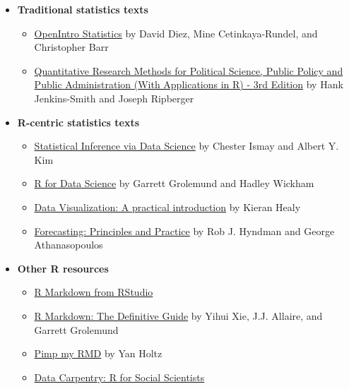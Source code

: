\documentclass[
]{book}
\providecommand{\tightlist}{%
  \setlength{\itemsep}{0pt}\setlength{\parskip}{0pt}}
\begin{document}
\begin{itemize}
\tightlist
\item
  \textbf{Traditional statistics texts}

  \begin{itemize}
  \tightlist
  \item
    \href{https://www.openintro.org/book/os/}{OpenIntro Statistics} by David Diez, Mine Cetinkaya-Rundel, and Christopher Barr
  \item
    \href{https://open.umn.edu/opentextbooks/textbooks/quantitative-research-methods-for-political-science-public-policy-and-public-administration-with-applications-in-r-3rd-edition}{Quantitative Research Methods for Political Science, Public Policy and Public Administration (With Applications in R) - 3rd Edition} by Hank Jenkins-Smith and Joseph Ripberger
  \end{itemize}
\item
  \textbf{R-centric statistics texts}

  \begin{itemize}
  \tightlist
  \item
    \href{https://moderndive.com/index.html}{Statistical Inference via Data Science} by Chester Ismay and Albert Y. Kim
  \item
    \href{https://r4ds.had.co.nz}{R for Data Science} by Garrett Grolemund and Hadley Wickham
  \item
    \href{https://socviz.co/index.html\#preface}{Data Visualization: A practical introduction} by Kieran Healy
  \item
    \href{https://otexts.com/fpp2/}{Forecasting: Principles and Practice} by Rob J. Hyndman and George Athanasopoulos
  \end{itemize}
\item
  \textbf{Other R resources}

  \begin{itemize}
  \tightlist
  \item
    \href{https://rmarkdown.rstudio.com/lesson-1.html}{R Markdown from RStudio}
  \item
    \href{https://bookdown.org/yihui/rmarkdown/}{R Markdown: The Definitive Guide} by Yihui Xie, J.J. Allaire, and Garrett Grolemund
  \item
    \href{https://holtzy.github.io/Pimp-my-rmd/\#text_formating}{Pimp my RMD} by Yan Holtz
  \item
    \href{https://datacarpentry.org/r-socialsci/}{Data Carpentry: R for Social Scientists}
  \end{itemize}
\end{itemize}
\end{document}
